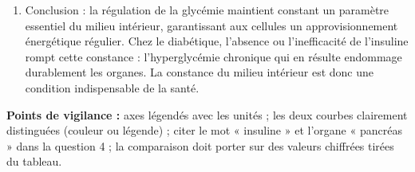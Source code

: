 \documentclass[11pt]{article}
\begin{document}
\begin{corrige}
\begin{enumerate}
\item Conclusion : la régulation de la glycémie maintient constant un paramètre essentiel du milieu intérieur, garantissant aux cellules un approvisionnement énergétique régulier. Chez le diabétique, l'absence ou l'inefficacité de l'insuline rompt cette constance : l'hyperglycémie chronique qui en résulte endommage durablement les organes. La constance du milieu intérieur est donc une condition indispensable de la santé.
\end{enumerate}
\textbf{Points de vigilance :} axes légendés avec les unités ; les deux courbes clairement distinguées (couleur ou légende) ; citer le mot « insuline » et l'organe « pancréas » dans la question 4 ; la comparaison doit porter sur des valeurs chiffrées tirées du tableau.
\end{corrige}
\end{document}
